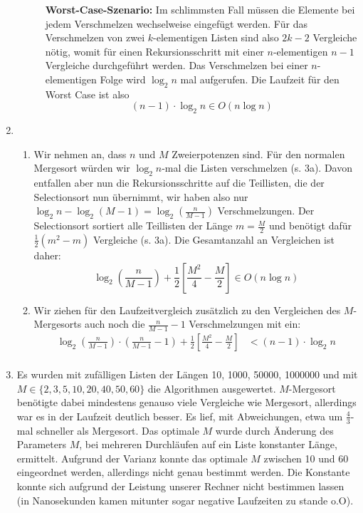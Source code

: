 \documentclass[a4paper,10pt]{scrartcl}
\begin{document}
\begin{enumerate}
\begin{description}
\textbf{Worst-Case-Szenario:}  Im schlimmsten Fall müssen die Elemente bei jedem Verschmelzen wechselweise eingefügt werden.
Für das Verschmelzen von zwei $k$-elementigen Listen sind also $2k-2$ Vergleiche nötig, womit für einen Rekursionsschritt mit einer $n$-elementigen $n - 1$ Vergleiche durchgeführt werden.
Das Verschmelzen bei einer $n$-elementigen Folge wird $\log_2 n$ mal aufgerufen.
Die Laufzeit für den Worst Case ist also
\[
 (n-1) \cdot \log_2 n \in O(n \log n)
\]
      \end{description}
\item \begin{enumerate}
       \item Wir nehmen an, dass $n$ und $M$ Zweierpotenzen sind. Für den normalen Mergesort würden wir $\log_2 n$-mal die Listen verschmelzen (s. 3a). Davon entfallen aber nun die Rekursionsschritte auf die Teillisten, die der Selectionsort nun übernimmt, wir haben also nur $\log_2 n - \log_2 (M-1) = \log_2\left(\frac{n}{M-1}\right)$ Verschmelzungen. Der Selectionsort sortiert alle Teillisten der Länge $m = \frac{M}{2}$ und benötigt dafür $\frac{1}{2}(m^2-m)$ Vergleiche (s. 3a). Die Gesamtanzahl an Vergleichen ist daher:
             \[\log_2\left(\frac{n}{M-1}\right) + \frac{1}{2}\left[\frac{M^2}{4}-\frac{M}{2}\right] \in O(n \log n)\]
       \item Wir ziehen für den Laufzeitvergleich zusätzlich zu den Vergleichen des $M$-Mergesorts auch noch die $\frac{n}{M-1}-1$ Verschmelzungen mit ein:
             \[
             \]
             \begin{align*}
              \log_2\left(\frac{n}{M-1}\right) \cdot \left(\frac{n}{M-1}-1\right) + \frac{1}{2}\left[\frac{M^2}{4}-\frac{M}{2}\right] &< (n-1) \cdot \log_2 n \\
             \end{align*}
      \end{enumerate}
\item Es wurden mit zufälligen Listen der Längen 10, 1000, 50000, 1000000 und mit $M \in \{2,3,5,10,20,40,50,60\}$ die Algorithmen ausgewertet. $M$-Mergesort benötigte dabei mindestens genauso viele Vergleiche wie Mergesort, allerdings war es in der Laufzeit deutlich besser. Es lief, mit Abweichungen, etwa um $\frac{4}{3}$-mal schneller als Mergesort.
Das optimale $M$ wurde durch Änderung des Parameters $M$, bei mehreren Durchläufen auf ein Liste konstanter Länge, ermittelt. Aufgrund der Varianz konnte das optimale $M$ zwischen 10 und 60 eingeordnet werden, allerdings nicht genau bestimmt werden.
Die Konstante konnte sich aufgrund der Leistung unserer Rechner nicht bestimmen lassen (in Nanosekunden kamen mitunter sogar negative Laufzeiten zu stande o.O).
      
      
      
      
\end{enumerate}
\end{document}
